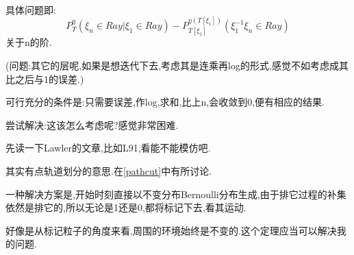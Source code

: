 					\begin{tri}[计算下移后的误差]
						\label{error}
						\ 

						具体问题即:
						$$P^{\eta}_T ( \xi_n \in Ray | \xi_1 \in Ray)-P^{\eta(T[\xi_1])}_{T[\xi_1]} ( \xi_1^{-1}\xi_n \in Ray )$$
						关于n的阶.

						(问题:其它的层呢,如果是想迭代下去,考虑其是连乘再log的形式,感觉不如考虑成其比之后与1的误差.)

						可行充分的条件是:只需要误差,作log,求和,比上n,会收敛到0,便有相应的结果.

						尝试解决:这该怎么考虑呢?感觉非常困难.


					\end{tri}

					\begin{tri}[去环的结论]
						\label{LE}
						先读一下Lawler的文章,比如L91,看能不能模仿吧.

						其实有点轨道划分的意思.在\ref{pathcut}中有所讨论.
					\end{tri}

					\begin{que}
						
						一种解决方案是,开始时刻直接以不变分布Bernoulli分布生成,由于排它过程的补集依然是排它的,所以无论是1还是0,都将标记下去,看其运动.

						好像是从标记粒子的角度来看,周围的环境始终是不变的.这个定理应当可以解决我的问题.

					\end{que}

